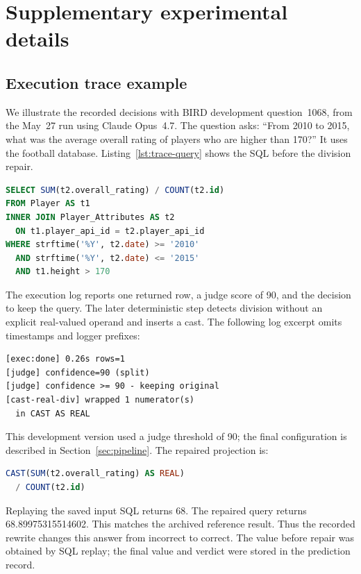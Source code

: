 \section{Supplementary experimental details}
\label{app:records}

\subsection{Execution trace example}
We illustrate the recorded decisions with BIRD development question~1068,
from the May~27 run using Claude Opus~4.7. The question asks:
``From 2010 to 2015, what was the average overall rating of players who are
higher than 170?'' It uses the football database.
Listing~\ref{lst:trace-query} shows the SQL before the division repair.

\begin{lstlisting}[language=SQL,caption={Generated SQL before the division repair.},label={lst:trace-query},captionpos=t]
SELECT SUM(t2.overall_rating) / COUNT(t2.id)
FROM Player AS t1
INNER JOIN Player_Attributes AS t2
  ON t1.player_api_id = t2.player_api_id
WHERE strftime('%Y', t2.date) >= '2010'
  AND strftime('%Y', t2.date) <= '2015'
  AND t1.height > 170
\end{lstlisting}

The execution log reports one returned row, a judge score of 90, and the
decision to keep the query. The later deterministic step detects division
without an explicit real-valued operand and inserts a cast. The following
log excerpt omits timestamps and logger prefixes:

\begin{lstlisting}[caption={Recorded execution and repair decisions.},label={lst:trace-decisions},captionpos=t]
[exec:done] 0.26s rows=1
[judge] confidence=90 (split)
[judge] confidence >= 90 - keeping original
[cast-real-div] wrapped 1 numerator(s)
  in CAST AS REAL
\end{lstlisting}

This development version used a judge threshold of 90; the final
configuration is described in Section~\ref{sec:pipeline}. The repaired
projection is:

\begin{lstlisting}[language=SQL]
CAST(SUM(t2.overall_rating) AS REAL)
  / COUNT(t2.id)
\end{lstlisting}

Replaying the saved input SQL returns 68. The repaired query returns
68.89975315514602. This matches the archived reference result. Thus the
recorded rewrite changes this answer from incorrect to correct. The value
before repair was obtained by SQL replay; the final value and verdict were
stored in the prediction record.

